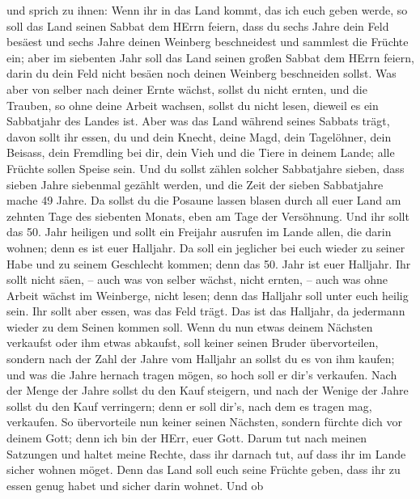 und sprich zu ihnen: Wenn ihr in das Land kommt, das ich euch geben
werde, so soll das Land seinen Sabbat dem HErrn feiern, 
dass du sechs Jahre dein Feld besäest und sechs Jahre deinen Weinberg
beschneidest und sammlest die Früchte ein;  aber im
siebenten Jahr soll das Land seinen großen Sabbat dem HErrn feiern,
darin du dein Feld nicht besäen noch deinen Weinberg beschneiden sollst.
 Was aber von selber nach deiner Ernte wächst, sollst du
nicht ernten, und die Trauben, so ohne deine Arbeit wachsen, sollst du
nicht lesen, dieweil es ein Sabbatjahr des Landes ist.  Aber
was das Land während seines Sabbats trägt, davon sollt ihr essen, du und
dein Knecht, deine Magd, dein Tagelöhner, dein Beisass, dein Fremdling
bei dir,  dein Vieh und die Tiere in deinem Lande; alle
Früchte sollen Speise sein.  Und du sollst zählen solcher
Sabbatjahre sieben, dass sieben Jahre siebenmal gezählt werden, und die
Zeit der sieben Sabbatjahre mache 49 Jahre.  Da sollst du
die Posaune lassen blasen durch all euer Land am zehnten Tage des
siebenten Monats, eben am Tage der Versöhnung.  Und ihr
sollt das 50. Jahr heiligen und sollt ein Freijahr ausrufen im Lande
allen, die darin wohnen; denn es ist euer Halljahr. Da soll ein
jeglicher bei euch wieder zu seiner Habe und zu seinem Geschlecht
kommen;  denn das 50. Jahr ist euer Halljahr. Ihr sollt
nicht säen, -- auch was von selber wächst, nicht ernten, -- auch was
ohne Arbeit wächst im Weinberge, nicht lesen;  denn das
Halljahr soll unter euch heilig sein. Ihr sollt aber essen, was das Feld
trägt.  Das ist das Halljahr, da jedermann wieder zu dem
Seinen kommen soll.  Wenn du nun etwas deinem Nächsten
verkaufst oder ihm etwas abkaufst, soll keiner seinen Bruder
übervorteilen,  sondern nach der Zahl der Jahre vom
Halljahr an sollst du es von ihm kaufen; und was die Jahre hernach
tragen mögen, so hoch soll er dir's verkaufen.  Nach der
Menge der Jahre sollst du den Kauf steigern, und nach der Wenige der
Jahre sollst du den Kauf verringern; denn er soll dir's, nach dem es
tragen mag, verkaufen.  So übervorteile nun keiner seinen
Nächsten, sondern fürchte dich vor deinem Gott; denn ich bin der HErr,
euer Gott.  Darum tut nach meinen Satzungen und haltet
meine Rechte, dass ihr darnach tut, auf dass ihr im Lande sicher wohnen
möget.  Denn das Land soll euch seine Früchte geben, dass
ihr zu essen genug habet und sicher darin wohnet.  Und ob
